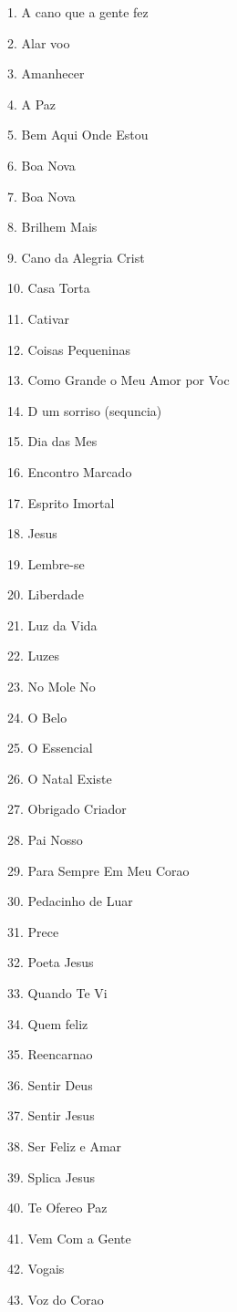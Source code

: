 \item\ 1. A cano que a gente fez
\item\ 2. Alar voo
\item\ 3. Amanhecer
\item\ 4. A Paz
\item\ 5. Bem Aqui Onde Estou
\item\ 6. Boa Nova
\item\ 7. Boa Nova
\item\ 8. Brilhem Mais
\item\ 9. Cano da Alegria Crist
\item\ 10. Casa Torta
\item\ 11. Cativar
\item\ 12. Coisas Pequeninas
\item\ 13. Como  Grande o Meu Amor por Voc
\item\ 14. D um sorriso (sequncia)
\item\ 15. Dia das Mes
\item\ 16. Encontro Marcado
\item\ 17. Esp\IeC {\'\i }rito Imortal
\item\ 18. Jesus
\item\ 19. Lembre-se
\item\ 20. Liberdade
\item\ 21. Luz da Vida
\item\ 22. Luzes
\item\ 23. No  Mole No
\item\ 24. O Belo
\item\ 25. O Essencial
\item\ 26. O Natal Existe
\item\ 27. Obrigado Criador
\item\ 28. Pai Nosso
\item\ 29. Para Sempre Em Meu Corao
\item\ 30. Pedacinho de Luar
\item\ 31. Prece
\item\ 32. Poeta Jesus
\item\ 33. Quando Te Vi
\item\ 34. Quem  feliz
\item\ 35. Reencarnao
\item\ 36. Sentir Deus
\item\ 37. Sentir Jesus
\item\ 38. Ser Feliz e Amar
\item\ 39. Splica  Jesus
\item\ 40. Te Ofereo Paz
\item\ 41. Vem Com a Gente
\item\ 42. Vogais
\item\ 43. Voz do Corao
